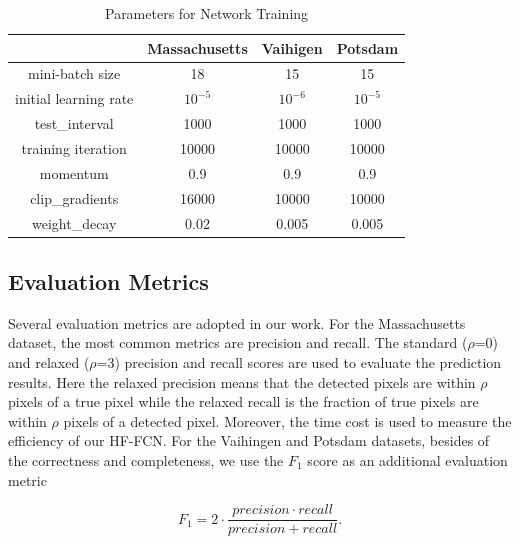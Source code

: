 \begin{table}
\centering
\caption {Parameters for Network Training}
\label{table:Train-Parameter}
\begin{tabular}{c|c|c|c}
\hline
&Massachusetts &Vaihigen &Potsdam\\  \hline
mini-batch size & 18& 15 & 15 \\
initial learning rate & $10^{-5}$ & $10^{-6}$ & $10^{-5}$\\
test\_interval&1000 & 1000 &1000\\
training iteration & 10000 & 10000& 10000\\
momentum & 0.9 & 0.9 & 0.9\\
clip\_gradients & 16000& 10000 & 10000\\
weight\_decay & 0.02& 0.005 & 0.005\\ \hline
\end{tabular}
\end{table}

\subsection{Evaluation Metrics}
Several evaluation metrics are adopted in our work.
For the Massachusetts dataset, the most common metrics are precision and recall.
The standard ($\rho$=0) and relaxed ($\rho$=3) precision and recall scores are used to evaluate the prediction results.
Here the relaxed precision means that the  detected pixels are within $\rho$ pixels of a true pixel while the relaxed recall is the fraction of true pixels are within $\rho$ pixels of a detected pixel. 
Moreover, the time cost is used to measure the efficiency of our HF-FCN.
%
For the Vaihingen and Potsdam datasets, besides of the correctness and completeness,
we use the $F_1$ score as an additional evaluation metric 


\begin{equation}
{F_1}= 2\cdot\frac{precision\cdot recall}{precision + recall}.
\end{equation}
